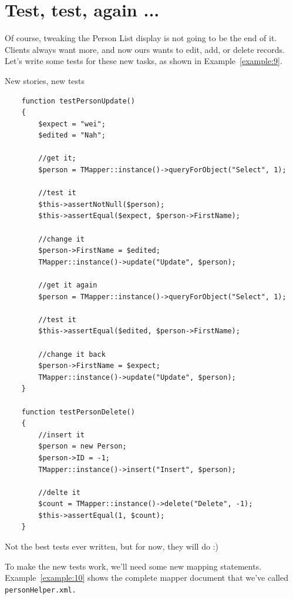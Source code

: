 \section{Test, test, again ...}
Of course, tweaking the Person List display is not going to be the end of it.
Clients always want more, and now ours wants to edit, add, or delete records.
Let's write some tests for these new tasks, as shown in
Example~\ref{example:9}.

\begin{example}\label{example:9}
New stories, new tests
\begin{verbatim}
    function testPersonUpdate()
    {
        $expect = "wei";
        $edited = "Nah";

        //get it;
        $person = TMapper::instance()->queryForObject("Select", 1);

        //test it
        $this->assertNotNull($person);
        $this->assertEqual($expect, $person->FirstName);

        //change it
        $person->FirstName = $edited;
        TMapper::instance()->update("Update", $person);

        //get it again
        $person = TMapper::instance()->queryForObject("Select", 1);

        //test it
        $this->assertEqual($edited, $person->FirstName);

        //change it back
        $person->FirstName = $expect;
        TMapper::instance()->update("Update", $person);
    }

    function testPersonDelete()
    {
        //insert it
        $person = new Person;
        $person->ID = -1;
        TMapper::instance()->insert("Insert", $person);

        //delte it
        $count = TMapper::instance()->delete("Delete", -1);
        $this->assertEqual(1, $count);
    }
\end{verbatim}
\end{example}

Not the best tests ever written, but for now, they will do :)

To make the new tests work, we'll need some new mapping statements.
Example~\ref{example:10} shows the complete mapper document that we've called
\tt{personHelper.xml}.

